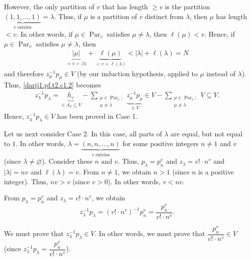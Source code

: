 \documentclass[10pt,a4paper]{article}
\begin{document}
However, the only partition of $v$ that has length $\geq v$ is the partition
$\underbrace{\left(  1,1,\ldots,1\right)  }_{v\text{ entries}}=\lambda$. Thus,
if $\mu$ is a partition of $v$ distinct from $\lambda$, then $\mu$ has length
$<v$. In other words, if $\mu\in\operatorname{Par}_{v}$ satisfies
$\mu\neq\lambda$, then $\ell\left(  \mu\right)  <v$. Hence, if $\mu
\in\operatorname{Par}_{v}$ satisfies $\mu\neq\lambda$, then
\begin{align*}
\underbrace{\left\vert \mu\right\vert }_{=v=\left\vert \lambda\right\vert
}+\underbrace{\ell\left(  \mu\right)  }_{<v=\ell\left(  \lambda\right)
}<\left\vert \lambda\right\vert +\ell\left(  \lambda\right)  =N
\end{align*}
and therefore $z_{\mu}^{-1}p_{\mu}\in V$ (by our induction hypothesis, applied
to $\mu$ instead of $\lambda$). Thus, \eqref{darij1.pf.t2.c1.2} becomes
\begin{align*}
z_{\lambda}^{-1}p_{\lambda}=\underbrace{h_v}_{\in\Lambda_{\mathbb{Z}
}\subseteq V}-\sum_{\substack{\mu\in\operatorname{Par}_{v};\\\mu
\neq\lambda}}\underbrace{z_{\mu}^{-1}p_{\mu}}_{\in V}\in V-\sum_{\substack{\mu
\in\operatorname{Par}_{v};\\\mu\neq\lambda}}V\subseteq V.
\end{align*}
Hence, $z_{\lambda}^{-1}p_{\lambda}\in V$ has been proved in Case 1.




Let us next consider Case 2. In this case, all parts of $\lambda$ are equal,
but not equal to $1$. In other words, $\lambda=\underbrace{\left(
n,n,\ldots,n\right)  }_{v\text{ entries}}$ for some positive integers $n\neq1$
and $v$ (since $\lambda\neq\varnothing$). Consider these $n$ and $v$. Thus,
$p_{\lambda}=p_n^v $ and $z_{\lambda}=v!\cdot n^v $ and $\left\vert
\lambda\right\vert =nv$ and $\ell\left(  \lambda\right)  =v$. From $n\neq1$,
we obtain $n>1$ (since $n$ is a positive integer). Thus, $nv > v$ (since $v > 0$). In other words, $v < nv$.




From $p_{\lambda}=p_n^v $ and $z_{\lambda}=v!\cdot n^v $, we obtain
\begin{equation}
z_{\lambda}^{-1}p_{\lambda}=\left(  v!\cdot n^v \right)  ^{-1}p_n
^v =\dfrac{p_n^v }{v!\cdot n^v }.
\label{darij1.pf.t2.c2.1}
\tag{2}
\end{equation}




We must prove that $z_{\lambda}^{-1}p_{\lambda}\in V$. In other words, we must
prove that $\dfrac{p_n^v }{v!\cdot n^v }\in V$ (since $z_{\lambda}
^{-1}p_{\lambda}=\dfrac{p_n^v }{v!\cdot n^v }$).
\end{document}
